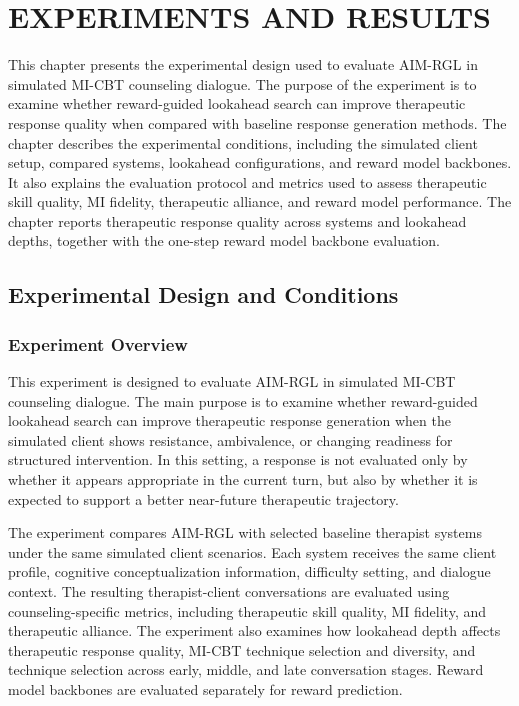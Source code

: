 \setlength{\footskip}{8mm}

\chapter{EXPERIMENTS AND RESULTS}

This chapter presents the experimental design used to evaluate AIM-RGL in simulated MI-CBT counseling dialogue. The purpose of the experiment is to examine whether reward-guided lookahead search can improve therapeutic response quality when compared with baseline response generation methods. The chapter describes the experimental conditions, including the simulated client setup, compared systems, lookahead configurations, and reward model backbones. It also explains the evaluation protocol and metrics used to assess therapeutic skill quality, MI fidelity, therapeutic alliance, and reward model performance. The chapter reports therapeutic response quality across systems and lookahead depths, together with the one-step reward model backbone evaluation.

\section{Experimental Design and Conditions}

\subsection{Experiment Overview}

This experiment is designed to evaluate AIM-RGL in simulated MI-CBT counseling dialogue. The main purpose is to examine whether reward-guided lookahead search can improve therapeutic response generation when the simulated client shows resistance, ambivalence, or changing readiness for structured intervention. In this setting, a response is not evaluated only by whether it appears appropriate in the current turn, but also by whether it is expected to support a better near-future therapeutic trajectory.

The experiment compares AIM-RGL with selected baseline therapist systems under the same simulated client scenarios. Each system receives the same client profile, cognitive conceptualization information, difficulty setting, and dialogue context. The resulting therapist-client conversations are evaluated using counseling-specific metrics, including therapeutic skill quality, MI fidelity, and therapeutic alliance. The experiment also examines how lookahead depth affects therapeutic response quality, MI-CBT technique selection and diversity, and technique selection across early, middle, and late conversation stages. Reward model backbones are evaluated separately for reward prediction.

